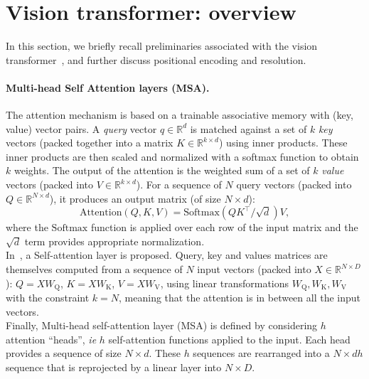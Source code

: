 \section{Vision transformer: overview} 
\label{sec:vit} 

In this section, we briefly recall preliminaries associated with the vision transformer~\cite{dosovitskiy2020image,Vaswani2017AttentionIA}, and further discuss positional encoding and resolution. 


\paragraph{Multi-head Self Attention layers (MSA).}
The attention mechanism is based on a trainable associative memory with (key, value) vector pairs. 
% 
A \emph{query} vector $q\in\mathbb{R}^d$ is matched against a set of $k$ \emph{key} vectors (packed together into a matrix $K\in\mathbb{R}^{k\times d}$) using inner products. 
These inner products are then scaled and normalized with a softmax function to obtain $k$ weights. 
The output of the attention is the weighted sum of a set of $k$ \emph{value} vectors (packed into $V\in\mathbb{R}^{k\times d}$). 
For a sequence of $N$ query vectors (packed into $Q\in\mathbb{R}^{N\times d}$), it produces an output matrix (of size $N\times d$): 
\begin{equation}
    \mathrm{Attention}(Q, K, V) = \mathrm{Softmax}(Q K^\top/\sqrt{d}) V,
\end{equation}
where the $\mathrm{Softmax}$ function is applied over each row of the input matrix and the $\sqrt{d}$ term provides appropriate normalization.\\
In~\cite{Vaswani2017AttentionIA}, a Self-attention layer is proposed.  Query, key and values matrices are themselves computed from a sequence of $N$ input vectors (packed into $X\in \mathbb{R}^{N\times D}$): 
$Q=XW_\mathrm{Q}$, $K=XW_\mathrm{K}$, $V=XW_\mathrm{V}$, using linear transformations $W_\mathrm{Q},W_\mathrm{K},W_\mathrm{V}$ with the constraint $k=N$, meaning that the attention is in between all the input vectors. \\
Finally, {Multi-head} self-attention layer (MSA) is defined by considering $h$ attention ``heads'', \textit{ie} $h$ self-attention functions  applied to the input. 
Each head provides a sequence of size $N\times d$. 
These $h$ sequences are rearranged into a $N \times dh$ sequence that is reprojected by a linear layer into $N \times D$. 

